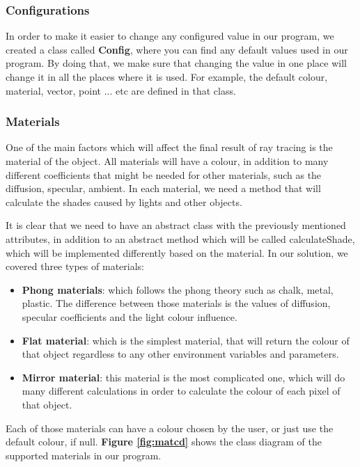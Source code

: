 \documentclass[a4paper]{report}
\begin{document}
	\subsubsection{Configurations}
	In order to make it easier to change any configured value in our program, we created a class called \textbf{Config}, where you can find any default values used in our program. By doing that, we make sure that changing the value in one place will change it in all the places where it is used. For example, the default colour, material, vector, point ... etc are defined in that class. 
	\subsubsection{Materials}
	\label{sssec:mat}One of the main factors which will affect the final result of ray tracing is the material of the object. All materials will have a colour, in addition to many different coefficients that might be needed for other materials, such as the diffusion, specular, ambient. In each material, we need a method that will calculate the shades caused by lights and other objects. \\
	\par It is clear that we need to have an abstract class with the previously mentioned attributes, in addition to an abstract method which will be called calculateShade, which will be implemented differently based on the material. In our solution, we covered three types of materials:
	\begin{itemize}
		\item \textbf{Phong materials}:  which follows the phong theory such as chalk, metal, plastic. The difference between those materials is the values of diffusion, specular coefficients and the light colour influence.
		\item \textbf{Flat material}: which is the simplest material, that will return the colour of that object regardless to any other environment variables and parameters.
		\item \textbf {Mirror material}: this material is the most complicated one, which will do many different calculations in order to calculate the colour of each pixel of that object.
	\end{itemize}
	Each of those materials can have a colour chosen by the user, or just use the default colour, if null. \textbf{Figure \ref{fig:matcd}} shows the class diagram of the supported materials in our program.
\end{document}
